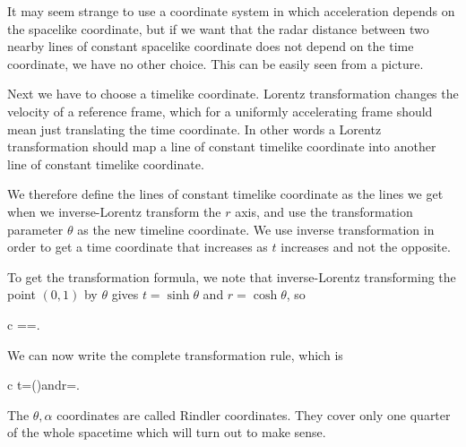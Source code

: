 \documentclass[11pt,oneside%
]{memoir}
\newenvironment{eqna}{\begin{IEEEeqnarray*}{c}}{\end{IEEEeqnarray*}\ignorespacesafterend}
\newcommand{\andd}{\qquad\textrm{and}\qquad}
\DeclareMathOperator{\arctanh}{arctanh}
\begin{document}
It may seem strange to use a coordinate system in which acceleration depends on the spacelike coordinate, but if we want that the radar distance between two nearby lines of constant spacelike coordinate does not depend on the time coordinate, we have no other choice. This can be easily seen from a picture.





Next we have to choose a timelike coordinate. Lorentz transformation changes the velocity of a reference frame, which for a uniformly accelerating frame should mean just translating the time coordinate. In other words a Lorentz transformation should map a line of constant timelike coordinate into another line of constant timelike coordinate.

We therefore define the lines of constant timelike coordinate as the lines we get when we inverse-Lorentz transform the \(r\) axis, and use the transformation parameter \(\theta\) as the new timeline coordinate. We use inverse transformation in order to get a time coordinate that increases as \(t\) increases and not the opposite.

To get the transformation formula, we note that inverse-Lorentz transforming the point \((0,1)\) by \(\theta\) gives \(t=\sinh\theta\) and \(r=\cosh\theta\), so
\begin{eqna}
=\frac{\sinh\theta}{\cosh\theta}=\tanh{\theta}.
\end{eqna}
We can now write the complete transformation rule, which is
\begin{eqna}
t\rightarrow\theta=\arctanh\left(\right)\andd r\rightarrow\alpha=.
\end{eqna}
The \(\theta,\alpha\) coordinates are called Rindler coordinates. They cover only one quarter of the whole spacetime which will turn out to make sense.
\end{document}

